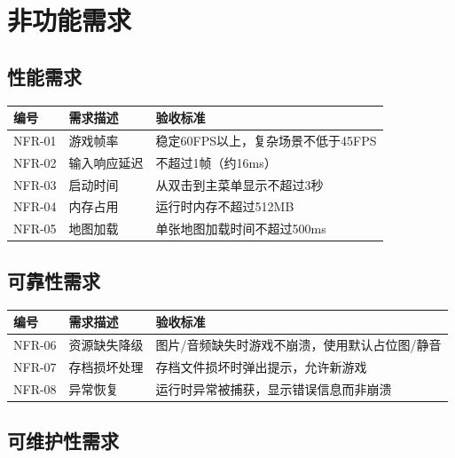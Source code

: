 \documentclass[12pt,a4paper]{article}
\begin{document}
\section{非功能需求}

\subsection{性能需求}

\begin{table}[htbp]
\centering
\begin{tabularx}{\textwidth}{lXX}
\toprule
\textbf{编号} & \textbf{需求描述} & \textbf{验收标准} \\
\midrule
NFR-01 & 游戏帧率 & 稳定60FPS以上，复杂场景不低于45FPS \\
NFR-02 & 输入响应延迟 & 不超过1帧（约16ms） \\
NFR-03 & 启动时间 & 从双击到主菜单显示不超过3秒 \\
NFR-04 & 内存占用 & 运行时内存不超过512MB \\
NFR-05 & 地图加载 & 单张地图加载时间不超过500ms \\
\bottomrule
\end{tabularx}
\end{table}

\subsection{可靠性需求}

\begin{table}[htbp]
\centering
\begin{tabularx}{\textwidth}{lXX}
\toprule
\textbf{编号} & \textbf{需求描述} & \textbf{验收标准} \\
\midrule
NFR-06 & 资源缺失降级 & 图片/音频缺失时游戏不崩溃，使用默认占位图/静音 \\
NFR-07 & 存档损坏处理 & 存档文件损坏时弹出提示，允许新游戏 \\
NFR-08 & 异常恢复 & 运行时异常被捕获，显示错误信息而非崩溃 \\
\bottomrule
\end{tabularx}
\end{table}

\subsection{可维护性需求}
\end{document}
